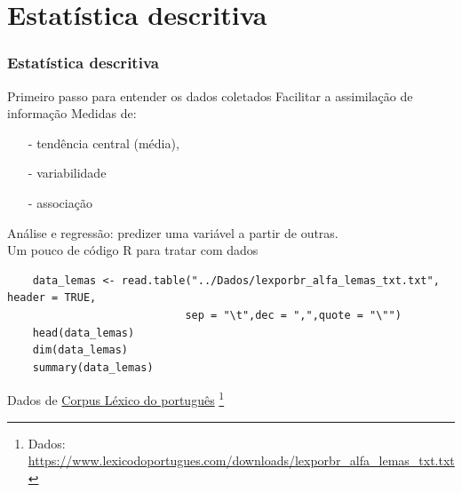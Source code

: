 \documentclass[14pt]{beamer}
\newcommand{\lfr}[1]{\let\thefootnote\relax\footnote{\hspace{0.6cm}\vspace{1.25cm} #1}}
\begin{document}
\section{Estatística descritiva}
\begin{frame}[t,fragile=singleslide]
\frametitle{Estatística descritiva}
	Primeiro passo para entender os dados coletados
	Facilitar a assimilação de informação
	Medidas de:
	\begin{itemize}
		\item[-] tendência central (média), 
		\item[-] variabilidade
		\item[-] associação
	\end{itemize}
	Análise e regressão: predizer uma variável a partir de outras.\\
	\vspace{1.0cm}
	Um pouco de código R para tratar com dados
	\begin{lstlisting}
	data_lemas <- read.table("../Dados/lexporbr_alfa_lemas_txt.txt", header = TRUE, 
							sep = "\t",dec = ",",quote = "\"")
	head(data_lemas)
	dim(data_lemas)
	summary(data_lemas)
	\end{lstlisting}
	\vspace{1.0cm}	
	Dados de \href{https://www.lexicodoportugues.com/}{Corpus Léxico do português}
	\vfill
	\lfr{Dados: \url{https://www.lexicodoportugues.com/downloads/lexporbr_alfa_lemas_txt.txt}}

\end{frame}
\end{document}
